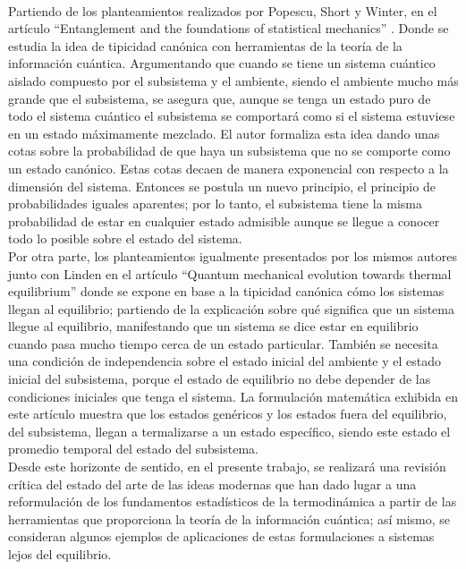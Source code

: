 \\
Partiendo de los planteamientos realizados por Popescu, Short y Winter, en el artículo “Entanglement and the foundations of statistical mechanics” \cite{Popescu2006}. Donde se estudia la idea de tipicidad canónica con herramientas de la teoría de la información cuántica. Argumentando que cuando se tiene un sistema cuántico aislado compuesto por el subsistema y el ambiente, siendo el ambiente mucho más grande que el subsistema, se asegura que, aunque se tenga un estado puro de todo el sistema cuántico el subsistema se comportará como si el sistema estuviese en un estado máximamente mezclado. El autor formaliza esta idea dando unas cotas sobre la probabilidad de que haya un subsistema que no se comporte como un estado canónico. Estas cotas decaen de manera exponencial con respecto a la dimensión del sistema. Entonces se postula un nuevo principio, el principio de probabilidades iguales aparentes; por lo tanto, el subsistema tiene la misma probabilidad de estar en cualquier estado admisible aunque se llegue a conocer todo lo posible sobre el estado del sistema.
\\
Por otra parte, los planteamientos igualmente presentados por los mismos autores junto con  Linden en el artículo “Quantum mechanical evolution towards thermal equilibrium” \cite{LindenPaper}  donde se expone en base a la tipicidad canónica cómo los sistemas llegan al equilibrio; partiendo de la explicación sobre qué significa que un sistema llegue al equilibrio, manifestando  que un sistema se dice estar en equilibrio cuando pasa mucho tiempo cerca de un estado particular. También se necesita una condición de independencia sobre el estado inicial del ambiente y el estado inicial del subsistema, porque el estado de equilibrio no debe depender de las condiciones iniciales que tenga el sistema.  La formulación matemática exhibida en este artículo muestra que los estados genéricos y los estados fuera del equilibrio, del subsistema, llegan a termalizarse a un estado específico, siendo este estado el promedio temporal del estado del subsistema.
\\
Desde este horizonte de sentido, en el presente trabajo, se realizará una revisión crítica del estado del arte de las ideas modernas que han dado lugar a una reformulación de los fundamentos estadísticos de la termodinámica a partir de las herramientas que proporciona la teoría de la información cuántica; así mismo, se consideran algunos ejemplos de aplicaciones de estas formulaciones a sistemas lejos del equilibrio.
\\

